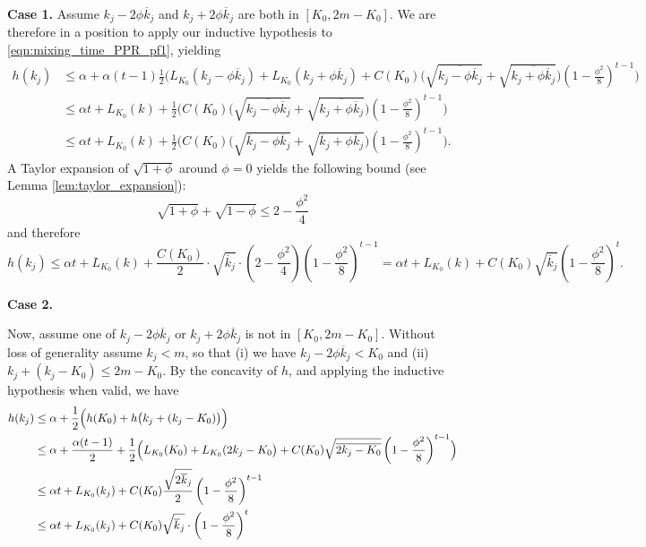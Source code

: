 \documentclass{article}
\newcommand{\1}{\mathbf{1}}
\theoremstyle{alden}
\theoremstyle{aldenthm}
\theoremstyle{remark}
\begin{document}
\textbf{Case 1.}
Assume $k_j - 2 \phi \overline{k}_j$ and $k_j + 2 \phi \overline{k}_j$ are both in $[K_0,2m  - K_0]$. We are therefore in a position to apply our inductive hypothesis to \eqref{eqn:mixing_time_PPR_pf1}, yielding
\begin{align*}
h(k_j) & \leq \alpha + \alpha(t-1) \frac{1}{2}\biggl(L_{K_0}(k_j - \phi \overline{k}_j) + L_{K_0}(k_j + \phi \overline{k}_j) + C(K_0)\bigl(\sqrt{\overline{k_j - \phi \overline{k}_j}} + \sqrt{\overline{k_j + \phi \overline{k}_j}}\bigr)\left(1 - \frac{\phi^2}{8}\right)^{t-1} \biggr) \\
& \leq \alpha t + L_{K_0}(k) + \frac{1}{2}\biggl(C(K_0)\bigl(\sqrt{\overline{k_j - \phi \overline{k}_j}} + \sqrt{\overline{k_j + \phi \overline{k}_j}}\bigr)\left(1 - \frac{\phi^2}{8}\right)^{t-1} \biggr) \\
& \leq \alpha t + L_{K_0}(k) + \frac{1}{2}\biggl(C(K_0)\bigl(\sqrt{\overline{k}_j - \phi \overline{k}_j} + \sqrt{\overline{k}_j + \phi \overline{k}_j}\bigr)\left(1 - \frac{\phi^2}{8}\right)^{t-1} \biggr).
\end{align*}
A Taylor expansion of $\sqrt{1 + \phi}$ around $\phi = 0$ yields the following bound (see Lemma \ref{lem:taylor_expansion}):
\begin{equation*}
\sqrt{1 + \phi} + \sqrt{1 - \phi} \leq 2 - \frac{\phi^2}{4}
\end{equation*}
and therefore
\begin{equation*}
h(k_j) \leq  \alpha t + L_{K_0}(k) + \frac{C(K_0)}{2}\cdot \sqrt{\overline{k}_j}\cdot\left(2 - \frac{\phi^2}{4}\right)\left(1 - \frac{\phi^2}{8}\right)^{t-1} = \alpha t + L_{K_0}(k) + C(K_0)\sqrt{\overline{k}_j}\left(1 - \frac{\phi^2}{8}\right)^{t}.
\end{equation*}

\textbf{Case 2.}

Now, assume one of $k_j - 2 \phi \overline{k}_j$ or $k_j + 2 \phi \overline{k}_j$ is not in $[K_0,2m  - K_0]$. Without loss of generality assume $k_j < m$, so that (i) we have $k_j - 2 \phi \overline{k}_j < K_0$ and (ii) $k_j + (k_j - K_0) \leq 2m - K_0$. By the concavity of $h$, and applying the inductive hypothesis when valid, we have
\begin{align*}
h(k_j) & \leq \alpha + \frac{1}{2}\Bigl(h(K_0) + h\bigl(k_j + (k_j - K_0)\bigr)\Bigr) \\
& \leq\alpha + \frac{\alpha(t - 1)}{2} + \frac{1}{2}\Bigl(L_{K_0}(K_0) + L_{K_0}(2k_j - K_0\bigr) + C(K_0)\sqrt{\overline{2k_j - K_0}}\left(1 - \frac{\phi^2}{8}\right)^{t - 1}\Bigr) \\
& \leq \alpha t + L_{K_0}(k_j) + C(K_0) \frac{\sqrt{2\overline{k}_j}}{2} \left(1 - \frac{\phi^2}{8}\right)^{t - 1} \\
& \leq \alpha t + L_{K_0}(k_j) + C(K_0) \sqrt{\overline{k}_j} \cdot \left(1 - \frac{\phi^2}{8}\right)^{t}
\end{align*}
\end{document}
